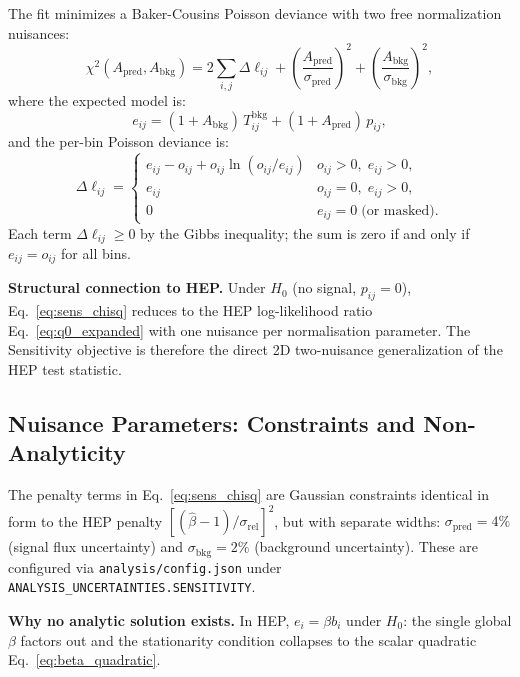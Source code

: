 \documentclass[12pt,a4paper]{article}
\newcommand{\bi}{b_{i}}                  %
\newcommand{\bhat}{\hat{\beta}}
\newcommand{\srel}{\sigma_{\mathrm{rel}}}
\newcommand{\Tbkg}{T^{\mathrm{bkg}}_{ij}}
\newcommand{\Apred}{A_{\mathrm{pred}}}
\newcommand{\Abkg}{A_{\mathrm{bkg}}}
\newcommand{\spred}{\sigma_{\mathrm{pred}}}
\newcommand{\sbkg}{\sigma_{\mathrm{bkg}}}
\newcommand{\eij}{e_{ij}}
\newcommand{\oij}{o_{ij}}
\begin{document}
The fit minimizes a Baker-Cousins Poisson deviance \cite{BakerCousins1984}
with two free normalization nuisances:
\begin{equation}
  \chi^2(\Apred,\Abkg)
  = 2\sum_{i,j}\Delta\ell_{ij}
    + \left(\frac{\Apred}{\spred}\right)^{\!2}
    + \left(\frac{\Abkg}{\sbkg}\right)^{\!2},
  \label{eq:sens_chisq}
\end{equation}
where the expected model is:
\begin{equation}
  \eij = (1+\Abkg)\,\Tbkg + (1+\Apred)\,p_{ij},
  \label{eq:sens_expected}
\end{equation}
and the per-bin Poisson deviance is:
\begin{equation}
  \Delta\ell_{ij} =
  \begin{cases}
    \eij - \oij + \oij\ln(\oij/\eij) & \oij>0,\; \eij>0,\\
    \eij & \oij=0,\; \eij>0,\\
    0 & \eij=0 \;\text{(or masked)}.
  \end{cases}
  \label{eq:sens_deviance}
\end{equation}
Each term $\Delta\ell_{ij}\ge0$ by the Gibbs inequality; the sum is zero
if and only if $\eij=\oij$ for all bins.

\medskip
\noindent\textbf{Structural connection to HEP.}
Under $H_0$ (no signal, $p_{ij}=0$), Eq.~\eqref{eq:sens_chisq} reduces to
the HEP log-likelihood ratio Eq.~\eqref{eq:q0_expanded} with one nuisance
per normalisation parameter.  The Sensitivity objective is therefore the
direct 2D two-nuisance generalization of the HEP test statistic.

\subsection{Nuisance Parameters: Constraints and Non-Analyticity}
\label{sec:sens_nuisances}

The penalty terms in Eq.~\eqref{eq:sens_chisq} are Gaussian constraints
identical in form to the HEP penalty $[(\bhat-1)/\srel]^2$, but with
separate widths: $\spred = 4\%$ (signal flux uncertainty) and
$\sbkg = 2\%$ (background uncertainty).
These are configured via \texttt{analysis/config.json} under
\texttt{ANALYSIS\_UNCERTAINTIES.SENSITIVITY}.

\medskip
\noindent\textbf{Why no analytic solution exists.}
In HEP, $e_i = \beta\bi$ under $H_0$:
the single global $\beta$ factors out and the stationarity condition
collapses to the scalar quadratic Eq.~\eqref{eq:beta_quadratic}.
\end{document}
